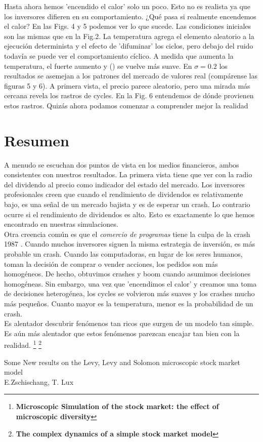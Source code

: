\documentclass[12pt,a4paper]{article}
\begin{document}
\quad Hasta ahora hemos 'encendido el calor' solo un poco. Esto no es realista ya que los inversores difieren en su comportamiento. ¿Qué pasa si realmente encendemos el calor? En las Figs. 4 y 5 podemos ver lo que sucede. Las condiciones iniciales son las mismas que en la Fig.2. La temperatura agrega el elemento aleatorio a la ejecución determinista y el efecto de 'difuminar' los ciclos, pero debajo del ruido todavía se puede ver el comportamiento cíclico. A medida que aumenta la temperatura, el fuerte aumento y () se vuelve más suave. En $\sigma = 0.2$ los resultados se asemejan a los patrones del mercado de valores real (compárense las figuras 5 y 6). A primera vista, el precio parece aleatorio, pero una mirada más cercana revela los rastros de cycles. En la Fig. 6 entendemos de dónde provienen estos rastros. Quizás ahora podamos comenzar a comprender mejor la realidad
\section*{Resumen}
\quad A menudo se escuchan dos puntos de vista en los medios financieros, ambos consistentes con nuestros resultados. La primera vista tiene que ver con la radio del dividendo al precio como indicador del estado del mercado. Los inversores profesionales creen que cuando el rendimiento de dividendos es relativamente bajo, es una señal de un mercado bajista y es de esperar un crash. Lo contrario ocurre si el rendimiento de dividendos es alto. Esto es exactamente lo que hemos encontrado en nuestras simulaciones.\\
\quad Otra creencia común es que el \textit{comercio de programas} tiene la culpa de la crash 1987 . Cuando muchos inversores siguen la misma estrategia de inversión, es más probable un crash. Cuando las computadoras, en lugar de los seres humanos, toman la decisión de comprar o vender acciones, los pedidos son más homogéneos. De hecho, obtuvimos crashes y boom cuando asumimos decisiones homogéneas. Sin embargo, una vez que 'encendimos el calor' y creamos una toma de decisiones heterogénea, los cycles se volvieron más suaves y los crashes mucho más pequeños. Cuanto mayor es la temperatura, menor es la probabilidad de un crash. \\
\quad Es alentador descubrir fenómenos tan ricos que surgen de un modelo tan simple. Es aún más alentador que estos fenómenos parezcan encajar tan bien con la realidad.
\newpage
\footnote{\textbf{Microscopic Simulation of the stock market: the effect of microscopic diversity}}
\newpage
\footnote{\textbf{The complex dynamics of a simple stock market model}}
\newpage
\begin{center}
Some New results on the Levy, Levy and Solomon microscopic stock market model\\
E.Zschischang, T. Lux\citep{Zschischang2001}
\end{center}
\end{document}

